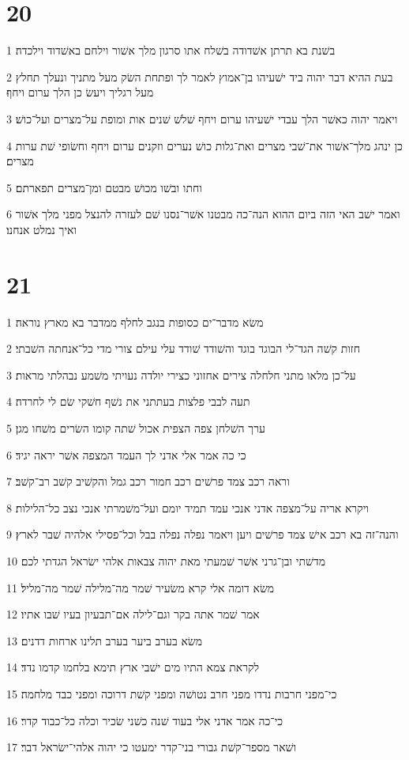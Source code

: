 \chapter{20}

\par 1 בשׁנת בא תרתן אשׁדודה בשׁלח אתו סרגון מלך אשׁור וילחם באשׁדוד וילכדה׃
\par 2 בעת ההיא דבר יהוה ביד ישׁעיהו בן־אמוץ לאמר לך ופתחת השׂק מעל מתניך ונעלך תחלץ מעל רגליך ויעשׂ כן הלך ערום ויחף׃
\par 3 ויאמר יהוה כאשׁר הלך עבדי ישׁעיהו ערום ויחף שׁלשׁ שׁנים אות ומופת על־מצרים ועל־כושׁ׃
\par 4 כן ינהג מלך־אשׁור את־שׁבי מצרים ואת־גלות כושׁ נערים וזקנים ערום ויחף וחשׂופי שׁת ערות מצרים׃
\par 5 וחתו ובשׁו מכושׁ מבטם ומן־מצרים תפארתם׃
\par 6 ואמר ישׁב האי הזה ביום ההוא הנה־כה מבטנו אשׁר־נסנו שׁם לעזרה להנצל מפני מלך אשׁור ואיך נמלט אנחנו׃

\chapter{21}

\par 1 משׂא מדבר־ים כסופות בנגב לחלף ממדבר בא מארץ נוראה׃
\par 2 חזות קשׁה הגד־לי הבוגד בוגד והשׁודד שׁודד עלי עילם צורי מדי כל־אנחתה השׁבתי׃
\par 3 על־כן מלאו מתני חלחלה צירים אחזוני כצירי יולדה נעויתי משׁמע נבהלתי מראות׃
\par 4 תעה לבבי פלצות בעתתני את נשׁף חשׁקי שׂם לי לחרדה׃
\par 5 ערך השׁלחן צפה הצפית אכול שׁתה קומו השׂרים משׁחו מגן׃
\par 6 כי כה אמר אלי אדני לך העמד המצפה אשׁר יראה יגיד׃
\par 7 וראה רכב צמד פרשׁים רכב חמור רכב גמל והקשׁיב קשׁב רב־קשׁב׃
\par 8 ויקרא אריה על־מצפה אדני אנכי עמד תמיד יומם ועל־משׁמרתי אנכי נצב כל־הלילות׃
\par 9 והנה־זה בא רכב אישׁ צמד פרשׁים ויען ויאמר נפלה נפלה בבל וכל־פסילי אלהיה שׁבר לארץ׃
\par 10 מדשׁתי ובן־גרני אשׁר שׁמעתי מאת יהוה צבאות אלהי ישׂראל הגדתי לכם׃
\par 11 משׂא דומה אלי קרא משׂעיר שׁמר מה־מלילה שׁמר מה־מליל׃
\par 12 אמר שׁמר אתה בקר וגם־לילה אם־תבעיון בעיו שׁבו אתיו׃
\par 13 משׂא בערב ביער בערב תלינו ארחות דדנים׃
\par 14 לקראת צמא התיו מים ישׁבי ארץ תימא בלחמו קדמו נדד׃
\par 15 כי־מפני חרבות נדדו מפני חרב נטושׁה ומפני קשׁת דרוכה ומפני כבד מלחמה׃
\par 16 כי־כה אמר אדני אלי בעוד שׁנה כשׁני שׂכיר וכלה כל־כבוד קדר׃
\par 17 ושׁאר מספר־קשׁת גבורי בני־קדר ימעטו כי יהוה אלהי־ישׂראל דבר׃

